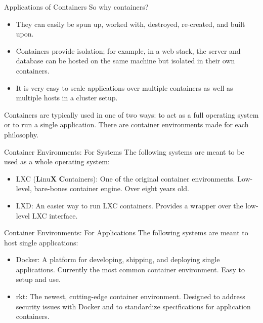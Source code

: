 \documentclass[xcolor=dvipsnames,aspectratio=1610]{beamer}
\begin{document}
  \begin{frame}{Applications of Containers}
    So why containers?

    \begin{itemize}
        \item They can easily be spun up, worked with, destroyed, re-created, and built upon.
        \item Containers provide isolation; for example, in a web stack, the server and database can be hosted on the same machine but isolated in their own containers.
        \item It is very easy to scale applications over multiple containers as well as multiple hosts in a cluster setup.
    \end{itemize}

    \vspace{10px}

    Containers are typically used in one of two ways: to act as a full operating system or to run a single application. There are container environments made for each philosophy.
  \end{frame}

  \begin{frame}{Container Environments: For Systems}
      The following systems are meant to be used as a whole operating system: \newline
      \begin{itemize}
          \setlength\itemsep{1.6em}
          \item \alert{LXC} (\textbf{L}inu\textbf{X} \textbf{C}ontainers): One of the original container environments. Low-level, bare-bones container engine. Over eight years old.
          \item \alert{LXD}: An easier way to run LXC containers. Provides a wrapper over the low-level LXC interface.
      \end{itemize}
  \end{frame}

  \begin{frame}{Container Environments: For Applications}
      The following systems are meant to host single applications: \newline
      \begin{itemize}
          \setlength\itemsep{1.6em}
          \item \alert{Docker}: A platform for developing, shipping, and deploying single applications. Currently the most common container environment. Easy to setup and use.
          \item \alert{rkt}: The newest, cutting-edge container environment. Designed to address security issues with Docker and to standardize specifications for application containers.
      \end{itemize}
  \end{frame}
\end{document}
